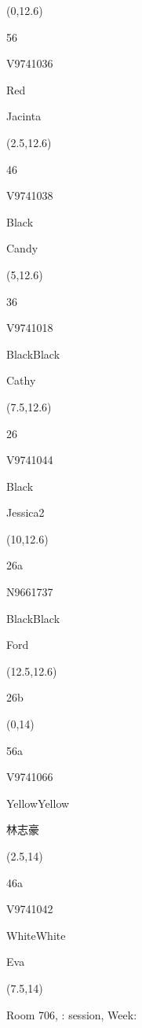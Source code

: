 \documentclass[a4paper]{article}
\newcommand{\myseat}[5]{%
\vspace{-0.1cm}
\parbox[t][2.2cm][t]{3.5cm}{
\small #1 %
\begin{description}
\vspace{-0.1cm}
\item [ID:] #2
\vspace{-0.1cm}
\item [Team:] #3 \normalsize
\vspace{-0.1cm}
\item \normalsize #4 #5
\vspace{-0.1cm}
\end{description}
}
}
\begin{document}
\begin{CJK}{UTF8}{cyberbit}
\begin{textblock}{2.5}(0,12.6)
\myseat{56}{V9741036}{Red}{Jacinta}{}
\end{textblock}

\begin{textblock}{2.5}(2.5,12.6)
\myseat{46}{V9741038}{Black}{Candy}{}
\end{textblock}

\begin{textblock}{2.5}(5,12.6)
\myseat{36}{V9741018}{BlackBlack}{Cathy}{}
\end{textblock}

\begin{textblock}{2.5}(7.5,12.6)
\myseat{26}{V9741044}{Black}{Jessica2}{}
\end{textblock}

\begin{textblock}{2.5}(10,12.6)
\myseat{26a}{N9661737}{BlackBlack}{Ford}{}
\end{textblock}

\begin{textblock}{2.5}(12.5,12.6)
\textblockcolor{}
\myseat{26b}{}{}{}{}
\end{textblock}

\begin{textblock}{2.5}(0,14)
\myseat{56a}{V9741066}{YellowYellow}{林志豪}{}
\end{textblock}

\begin{textblock}{2.5}(2.5,14)
\myseat{46a}{V9741042}{WhiteWhite}{Eva}{}
\end{textblock}

\begin{textblock}{7.5}(7.5,14)
\textblockcolor{}
\parbox[t][2.2cm][t]{9.5cm}{%
\large Room 706, :  session, Week: 
}
\end{textblock}

\end{CJK}
\end{document}
